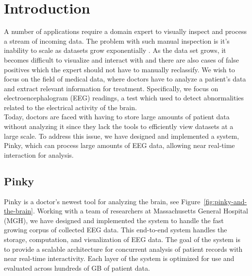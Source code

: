 \chapter{Introduction}\label{intro-ch}

A number of applications require a domain expert to visually inspect and
process a stream of incoming data. The problem with such manual inspection is
it's inability to scale as datasets grow exponentially \cite{exp-growth}. As
the data set grows, it becomes difficult to visualize and interact with
\cite{immens} and there are also cases of false positives which the expert
should not have to manually reclassify. We wish to focus on the field of
medical data, where doctors have to analyze a patient's data and extract relevant
information for treatment. Specifically, we focus on electroencephalogram (EEG)
readings, a test which used to detect abnormalities related to the electrical
activity of the brain. \\

Today, doctors are faced with having to store large amounts of patient data
without analyzing it since they lack the tools to efficiently view datasets at a
large scale. To address this issue, we have designed and implemented a system,
Pinky, which can process large amounts of EEG data, allowing near real-time
interaction for analysis.


\section{Pinky}

Pinky is a doctor's newest tool for analyzing the brain, see
Figure~\ref{fig:pinky-and-the-brain}. Working with a team of researchers at
Massachusetts General Hospital (MGH), we have designed and implemented the
system to handle the fast growing corpus of collected EEG data. This end-to-end
system handles the storage, computation, and visualization of EEG data. The
goal of the system is to provide a scalable architecture for concurrent
analysis of patient records with near real-time interactivity. Each layer of
the system is optimized for use and evaluated across hundreds of GB of patient
data. \\

